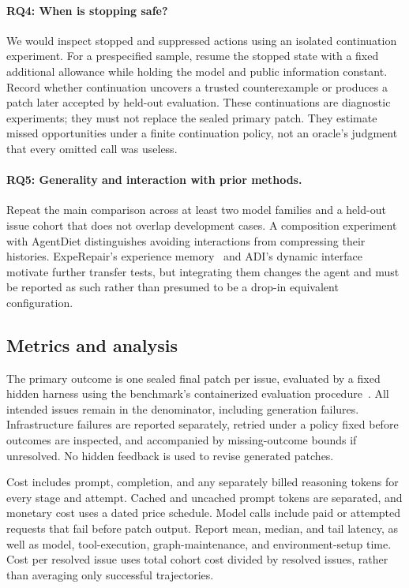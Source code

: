 \documentclass[acmsmall,screen,review,anonymous]{acmart}
\begin{document}
\paragraph{RQ4: When is stopping safe?}
We would inspect stopped and suppressed actions using an isolated continuation experiment. For a prespecified sample, resume the stopped state with a fixed additional allowance while holding the model and public information constant. Record whether continuation uncovers a trusted counterexample or produces a patch later accepted by held-out evaluation. These continuations are diagnostic experiments; they must not replace the sealed primary patch. They estimate missed opportunities under a finite continuation policy, not an oracle's judgment that every omitted call was useless.

\paragraph{RQ5: Generality and interaction with prior methods.}
Repeat the main comparison across at least two model families and a held-out issue cohort that does not overlap development cases. A composition experiment with AgentDiet distinguishes avoiding interactions from compressing their histories. ExpeRepair's experience memory~\cite{mu2026experepair} and ADI's dynamic interface~\cite{xiang2026adi} motivate further transfer tests, but integrating them changes the agent and must be reported as such rather than presumed to be a drop-in equivalent configuration.

\subsection{Metrics and analysis}
The primary outcome is one sealed final patch per issue, evaluated by a fixed hidden harness using the benchmark's containerized evaluation procedure~\cite{swebenchdocs}. All intended issues remain in the denominator, including generation failures. Infrastructure failures are reported separately, retried under a policy fixed before outcomes are inspected, and accompanied by missing-outcome bounds if unresolved. No hidden feedback is used to revise generated patches.

Cost includes prompt, completion, and any separately billed reasoning tokens for every stage and attempt. Cached and uncached prompt tokens are separated, and monetary cost uses a dated price schedule. Model calls include paid or attempted requests that fail before patch output. Report mean, median, and tail latency, as well as model, tool-execution, graph-maintenance, and environment-setup time. Cost per resolved issue uses total cohort cost divided by resolved issues, rather than averaging only successful trajectories.
\end{document}
